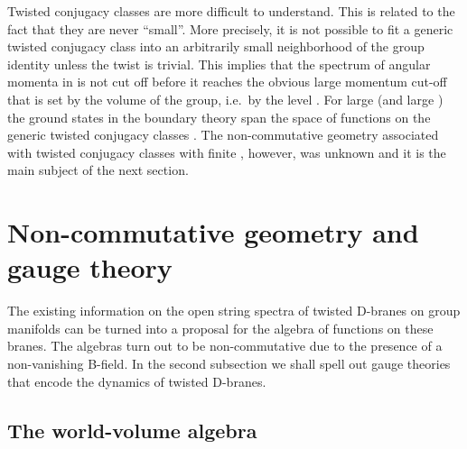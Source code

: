 \documentclass[12pt,a4paper]{article}
\providecommand{\mc}{\mathcal} %
\def\bL{\mc{B}} %
\def\tareps{\bL^\omega_k} %
\def\om{\omega}
\def\a{\alpha}
\begin{document}
Twisted conjugacy classes are more difficult to understand. 
This is related to the fact that they are never ``small''. More
precisely, it is not possible to fit a generic twisted conjugacy 
class into an arbitrarily small neighborhood of the group identity 
unless the twist \myHighlight{$\omega$}\coordHE{} is trivial. This implies that the 
spectrum of angular momenta in \myHighlight{$Z_{\a\a}^\om$}\coordHE{} is not cut off 
before it reaches the obvious large momentum cut-off that is 
set by the volume of the group, i.e.\ by the level \coordHE{}. For
large \myHighlight{$\a\in\tareps$}\coordHE{} (and large \coordHE{}) the ground states in the boundary 
theory span the space of functions on the generic twisted conjugacy 
classes \myHighlight{$C^\om_u$}\coordHE{} \cite{Felder:1999ka}. The non-commutative geometry 
associated with twisted conjugacy classes with finite \myHighlight{$\a$}\coordHE{}, however, 
was unknown and it is the main subject of the next section.     

\section{Non-commutative geometry and gauge theory}

The existing information on the open string spectra of twisted 
D-branes on group manifolds can be turned into a proposal for 
the algebra of functions on these branes. The algebras turn out 
to be non-commutative due to the presence of a non-vanishing B-field. 
In the second subsection we shall spell out gauge theories that 
encode the dynamics of twisted D-branes.     

\subsection{The world-volume algebra}
\end{document}
